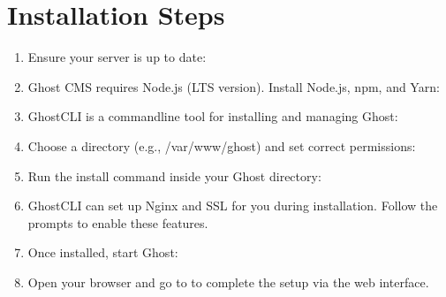 \documentclass[letterpaper,10pt,english]{sphinxmanual}
\begin{document}
\section{Installation Steps}
\label{\detokenize{setup_backend:installation-steps}}\begin{enumerate}
%
\item {} 
\sphinxAtStartPar
{}
Ensure your server is up to date:

\item {} 
\sphinxAtStartPar
{}
Ghost CMS requires Node.js (LTS version). Install Node.js, npm, and Yarn:

\item {} 
\sphinxAtStartPar
{}
Ghost\sphinxhyphen{}CLI is a command\sphinxhyphen{}line tool for installing and managing Ghost:

\item {} 
\sphinxAtStartPar
{}
Choose a directory (e.g., /var/www/ghost) and set correct permissions:

\item {} 
\sphinxAtStartPar
{}
Run the install command inside your Ghost directory:

\item {} 
\sphinxAtStartPar
{}
Ghost\sphinxhyphen{}CLI can set up Nginx and SSL for you during installation. Follow the prompts to enable these features.

\item {} 
\sphinxAtStartPar
{}
Once installed, start Ghost:

\item {} 
\sphinxAtStartPar
{}
Open your browser and go to  to complete the setup via the web interface.

\end{enumerate}
\end{document}
